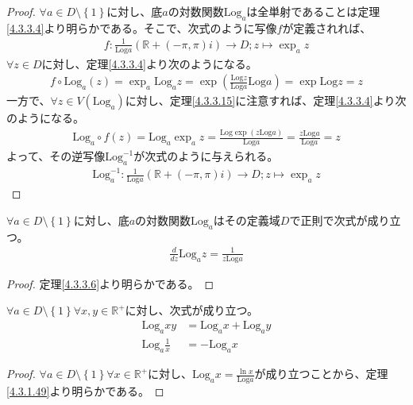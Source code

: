 \documentclass[dvipdfmx]{jsarticle}
\begin{document}
\begin{proof}
$\forall a \in D \setminus \left\{ 1 \right\}$に対し、底$a$の対数関数$\mathrm{Log}_{a}$は全単射であることは定理\ref{4.3.3.4}より明らかである。そこで、次式のように写像$f$が定義されれば、
\begin{align*}
f:\frac{1}{\mathrm{Log}a}\left( \mathbb{R} + ( - \pi,\pi)i \right) \rightarrow D;z \mapsto \exp_{a}z
\end{align*}
$\forall z \in D$に対し、定理\ref{4.3.3.4}より次のようになる。
\begin{align*}
f \circ \mathrm{Log}_{a}(z) = \exp_{a}{\mathrm{Log}_{a}z} = \exp\left( \frac{\mathrm{Log}z}{\mathrm{Log}a}\mathrm{Log}a \right) = \exp{\mathrm{Log}z} = z
\end{align*}
一方で、$\forall z \in V\left( \mathrm{Log}_{a} \right)$に対し、定理\ref{4.3.3.15}に注意すれば、定理\ref{4.3.3.4}より次のようになる。
\begin{align*}
\mathrm{Log}_{a} \circ f(z) = \mathrm{Log}_{a}{\exp_{a}z} = \frac{\mathrm{Log}{\exp\left( z\mathrm{Log}a \right)}}{\mathrm{Log}a} = \frac{z\mathrm{Log}a}{\mathrm{Log}a} = z
\end{align*}
よって、その逆写像$\mathrm{Log}_{a}^{- 1}$が次式のように与えられる。
\begin{align*}
\mathrm{Log}_{a}^{- 1}:\frac{1}{\mathrm{Log}a}\left( \mathbb{R} + ( - \pi,\pi)i \right) \rightarrow D;z \mapsto \exp_{a}z
\end{align*}
\end{proof}
\begin{thm}\label{4.3.3.19}
$\forall a \in D \setminus \left\{ 1 \right\}$に対し、底$a$の対数関数$\mathrm{Log}_{a}$はその定義域$D$で正則で次式が成り立つ。
\begin{align*}
\frac{d}{dz}\mathrm{Log}_{a}z = \frac{1}{z\mathrm{Log}a}
\end{align*}
\end{thm}
\begin{proof} 定理\ref{4.3.3.6}より明らかである。
\end{proof}
\begin{thm}\label{4.3.3.20}
$\forall a \in D \setminus \left\{ 1 \right\}\forall x,y \in \mathbb{R}^{+}$に対し、次式が成り立つ。
\begin{align*}
\mathrm{Log}_{a}{xy} &= \mathrm{Log}_{a}x + \mathrm{Log}_{a}y\\
\mathrm{Log}_{a}\frac{1}{x} &= - \mathrm{Log}_{a}x
\end{align*}
\end{thm}
\begin{proof}
$\forall a \in D \setminus \left\{ 1 \right\}\forall x \in \mathbb{R}^{+}$に対し、$\mathrm{Log}_{a}x = \frac{\ln x}{\mathrm{Log}a}$が成り立つことから、定理\ref{4.3.1.49}より明らかである。
\end{proof}
\end{document}
